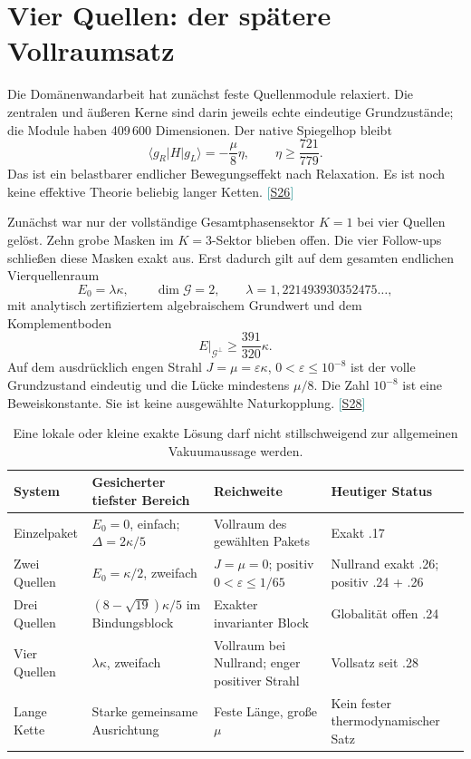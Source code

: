 \documentclass[11pt,a4paper,oneside,parskip=half,headings=normal,numbers=noenddot,bibliography=totoc]{scrreprt}
\newcommand{\src}[1]{\textcolor{teal}{\small[\hyperref[s:#1]{S#1}]}}
\begin{document}
\section{Vier Quellen: der spätere Vollraumsatz}
Die Domänenwandarbeit hat zunächst feste Quellenmodule relaxiert. Die zentralen und äußeren Kerne sind darin jeweils echte eindeutige Grundzustände; die Module haben 409\,600 Dimensionen. Der native Spiegelhop bleibt
\[
 \langle g_R|H|g_L\rangle=-\frac\mu8\eta,\qquad
 \eta\ge\frac{721}{779}.
\]
Das ist ein belastbarer endlicher Bewegungseffekt nach Relaxation. Es ist noch keine effektive Theorie beliebig langer Ketten. \src{26}

Zunächst war nur der vollständige Gesamtphasensektor $K=1$ bei vier Quellen gelöst. Zehn grobe Masken im $K=3$-Sektor blieben offen. Die vier Follow-ups schließen diese Masken exakt aus. Erst dadurch gilt auf dem gesamten endlichen Vierquellenraum
\[
 E_0=\lambda\kappa,\qquad\dim\mathcal G=2,\qquad
 \lambda=1{,}221493930352475\ldots,
\]
mit analytisch zertifiziertem algebraischem Grundwert und dem Komplementboden
\[
 E\big|_{\mathcal G^\perp}\ge\frac{391}{320}\kappa.
\]
Auf dem ausdrücklich engen Strahl $J=\mu=\varepsilon\kappa$, $0<\varepsilon\le10^{-8}$ ist der volle Grundzustand eindeutig und die Lücke mindestens $\mu/8$. Die Zahl $10^{-8}$ ist eine Beweiskonstante. Sie ist keine ausgewählte Naturkopplung. \src{28}

\begin{table}[ht]
\centering\small
\begin{tabularx}{\textwidth}{@{}lYYY@{}}
\toprule
System & Gesicherter tiefster Bereich & Reichweite & Heutiger Status\\\midrule
Einzelpaket & $E_0=0$, einfach; $\Delta=2\kappa/5$ & Vollraum des gewählten Pakets & Exakt .17\\
Zwei Quellen & $E_0=\kappa/2$, zweifach & $J=\mu=0$; positiv $0<\varepsilon\le1/65$ & Nullrand exakt .26; positiv .24 + .26\\
Drei Quellen & $(8-\sqrt{19})\kappa/5$ im Bindungsblock & Exakter invarianter Block & Globalität offen .24\\
Vier Quellen & $\lambda\kappa$, zweifach & Vollraum bei Nullrand; enger positiver Strahl & Vollsatz seit .28\\
Lange Kette & Starke gemeinsame Ausrichtung & Feste Länge, große $\mu$ & Kein fester thermodynamischer Satz\\\bottomrule
\end{tabularx}
\caption{Eine lokale oder kleine exakte Lösung darf nicht stillschweigend zur allgemeinen Vakuumaussage werden.}
\end{table}
\end{document}
